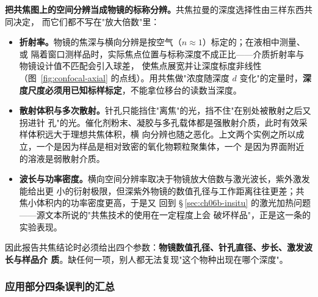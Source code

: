 \begin{pitfall}
\textbf{把共焦图上的空间分辨当成物镜的标称分辨。}共焦拉曼的深度选择性由三样东西共同决定，
而它们都不写在"放大倍数"里：
\begin{itemize}
\item \textbf{折射率。}物镜的焦深与横向分辨是按空气（$n\approx1$）标定的；在液相中测量、或
  隔着窗口测样品时，实际焦点位置与标称深度不成正比——介质折射率与物镜设计值不匹配会引入球差，
  使焦点展宽并让深度标度非线性（图~\ref{fig:confocal-axial} 的点线）。用共焦做"浓度随深度
  $d$ 变化"的定量时，\textbf{深度尺度必须用已知标样标定}，不能拿位移台的读数当深度。
\item \textbf{散射体积与多次散射。}针孔只能挡住"离焦"的光，挡不住"在别处被散射之后又拐进针
  孔"的光。催化剂粉末、凝胶与多孔载体都是强散射介质，此时有效采样体积远大于理想共焦体积，横
  向分辨也随之恶化。上文两个实例之所以成立，一个是因为样品是相对致密的氧化物颗粒聚集体，一个
  是因为界面附近的溶液是弱散射介质。
\item \textbf{波长与功率密度。}横向空间分辨率取决于物镜放大倍数与激光波长，紫外激发能给出更
  小的衍射极限，但深紫外物镜的数值孔径与工作距离往往更差；共焦小体积内的功率密度更高，于是又
  回到 \S\,\ref{sec:ch06b-insitu} 的激光加热问题——源文本所说的"共焦技术的使用在一定程度上会
  破坏样品"，正是这一条的实验表现。
\end{itemize}
因此报告共焦结论时必须给出四个参数：\textbf{物镜数值孔径、针孔直径、步长、激发波长与样品介
质}。缺任何一项，别人都无法复现"这个物种出现在哪个深度"。
\end{pitfall}

\subsubsection{应用部分四条误判的汇总}

